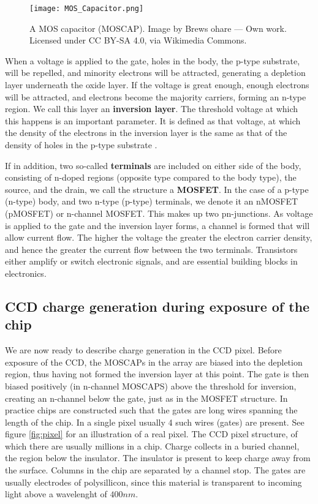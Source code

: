 \documentclass[../main.tex]{subfiles}
\begin{document}
	\begin{figure}[h!]
		\centering
		\texttt{[image: MOS\_Capacitor.png]}
		\caption{A MOS capacitor (MOSCAP). Image by Brews ohare — Own work. Licensed under CC BY-SA 4.0, via Wikimedia Commons.
		}
		\label{fig:mosfet}
	\end{figure}
	When a voltage is applied to the gate, holes in the body, the p-type substrate, will be repelled, and minority electrons will be attracted, generating a depletion layer underneath the oxide layer. If the voltage is great enough, enough electrons will be attracted, and electrons become the majority carriers, forming an n-type region. We call this layer an \textbf{inversion layer}. The threshold voltage at which this happens is an important parameter. It is defined as that voltage, at which the density of the electrons in the inversion layer is the same as that of the density of holes in the p-type substrate \cite{solidstatephysicsbook}. 
	
	If in addition, two so-called \textbf{terminals} are included on either side of the body, consisting of n-doped regions (opposite type compared to the body type), the source, and the drain, we call the structure a \textbf{MOSFET}. In the case of a p-type (n-type) body, and two n-type (p-type) terminals, we denote it an nMOSFET (pMOSFET)  or n-channel MOSFET. This makes up two pn-junctions. As voltage is applied to the gate and the inversion layer forms, a channel is formed that will allow current flow. The higher the voltage the greater the electron carrier density, and hence the greater the current flow between the two terminals. Transistors either amplify or switch electronic signals, and are essential building blocks in electronics. 
	
	\subsection{CCD charge generation during exposure of the chip}
	We are now ready to describe charge generation in the CCD pixel. Before exposure of the CCD, the MOSCAPs in the array are biased into the depletion region, thus having not formed the inversion layer at this point. The gate is then biased positively (in n-channel MOSCAPS) above the threshold for inversion, creating an n-channel below the gate, just as in the MOSFET structure. In practice chips are constructed such that the gates are long wires spanning the length of the chip. In a single pixel usually 4 such wires (gates) are present. See figure \ref{fig:pixel} for an illustration of a real pixel. The CCD pixel structure, of which there are usually millions in a chip. Charge collects in a buried channel, the region below the insulator. The insulator is present to keep charge away from the surface. Columns in the chip are separated by a channel stop. The gates are usually electrodes of polysillicon, since this material is transparent to incoming light above a wavelenght of $400nm$.
	
\end{document}
